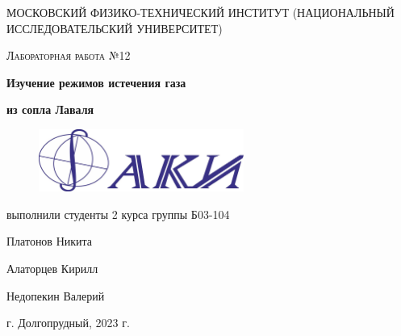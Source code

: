 
\begin{titlepage}
	\centering
	\vspace{5cm}
	{\scshape\LARGE МОСКОВСКИЙ ФИЗИКО-ТЕХНИЧЕСКИЙ ИНСТИТУТ (НАЦИОНАЛЬНЫЙ ИССЛЕДОВАТЕЛЬСКИЙ УНИВЕРСИТЕТ)
 \par}
	\vspace{4cm}
	{\scshape\Large Лабораторная работа №12 \par}
	\vspace{1cm}
	{\huge\bfseries Изучение режимов истечения газа \par}
    {\huge\bfseries  из сопла Лаваля  \par}
\vspace{1cm}
\begin {figure}[H]
\begin{center}
\includegraphics[width=0.6\textwidth]{faki.png}
\end{center}
\end {figure}
\vspace{1cm}
\begin{flushright}
	{\large выполнили студенты 2 курса группы Б03-104}\par
	\vspace{0.3cm}
	{\LARGE Платонов Никита}\par
    \vspace{0.3cm}
    {\LARGE Алаторцев Кирилл}\par
    \vspace{0.3cm}
    {\LARGE Недопекин Валерий}\par
\end{flushright}
	\vfill
	г. Долгопрудный, 2023 г.
\end{titlepage}

